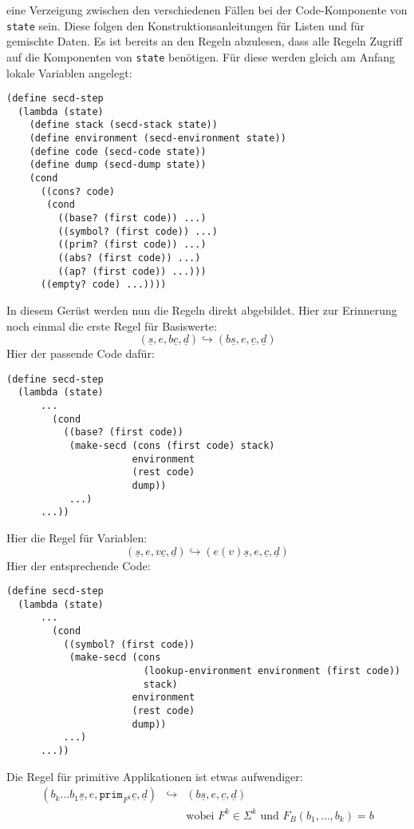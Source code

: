 eine Verzeigung zwischen den verschiedenen Fällen bei der
Code-Komponente von \lstinline{state} sein.  Diese folgen den
Konstruktionsanleitungen für Listen und für gemischte Daten.  Es ist
bereits an den Regeln abzulesen, dass alle Regeln Zugriff auf die
Komponenten von \lstinline{state} benötigen.  Für diese werden gleich am
Anfang lokale Variablen angelegt:
%
\begin{lstlisting}
(define secd-step
  (lambda (state)
    (define stack (secd-stack state))
    (define environment (secd-environment state))
    (define code (secd-code state))
    (define dump (secd-dump state))
    (cond
      ((cons? code)
       (cond
         ((base? (first code)) ...)
         ((symbol? (first code)) ...)
         ((prim? (first code)) ...)
         ((abs? (first code)) ...)
         ((ap? (first code)) ...)))
      ((empty? code) ...))))
\end{lstlisting}
%
In diesem Gerüst werden nun die Regeln direkt abgebildet.  Hier zur
Erinnerung noch einmal die erste Regel für Basiswerte:
%
\begin{displaymath}
  (\underline{s}, e, b\underline{c}, \underline{d})
  \hookrightarrow
  (b\underline{s}, e, \underline{c}, \underline{d})
\end{displaymath}
%
Hier der passende Code dafür:
%
\begin{lstlisting}
(define secd-step
  (lambda (state)
      ...
        (cond
          ((base? (first code))
           (make-secd (cons (first code) stack)
                      environment
                      (rest code)
                      dump))
           ...)
      ...))
\end{lstlisting}
%
Hier die Regel für Variablen:
\begin{displaymath}
  (\underline{s}, e, v\underline{c}, \underline{d})
  \hookrightarrow
  (e(v)\underline{s}, e, \underline{c}, \underline{d})
\end{displaymath}
%
Hier der entsprechende Code:
%
\begin{lstlisting}
(define secd-step
  (lambda (state)
      ...
        (cond
          ((symbol? (first code))
           (make-secd (cons
                        (lookup-environment environment (first code))
                        stack)
                      environment
                      (rest code)
                      dump))
          ...)
      ...))
\end{lstlisting}
%
Die Regel für primitive Applikationen ist etwas aufwendiger:
%
\begin{eqnarray*}
  (b_k\ldots b_1 \underline{s}, e, \mathtt{prim}_{F^k}\underline{c}, \underline{d})
  &\hookrightarrow&
  (b\underline{s}, e, \underline{c}, \underline{d})
  \\ && \textrm{wobei $F^k\in\Sigma^k$ und $F_B(b_1,\ldots,b_k) = b$}
\end{eqnarray*}
